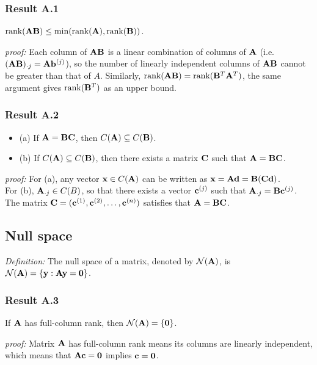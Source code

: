 \subsubsection*{Result A.1}
$\mbox{rank}(\mathbf{AB}) \le \min(\mbox{rank}(\mathbf{A}), \mbox{rank}(\mathbf{B}))$.

{\it proof:} Each column of $\mathbf{AB}$ is a linear combination of columns of $\mathbf{A}$ (i.e.~$(\mathbf{AB})_{\cdot j} = \mathbf{A} \mathbf{b}^{(j)}$), 
so the number of linearly independent columns of $\mathbf{AB}$ cannot be greater than that of $A$.  Similarly, $\mbox{rank}(\mathbf{AB}) = \mbox{rank}(\mathbf{B}^T\mathbf{A}^T)$, the same argument gives $\mbox{rank}(\mathbf{B}^T)$ as an upper bound.


\subsubsection*{Result A.2}
\begin{itemize}
 \item (a) If $\mathbf{A} = \mathbf{BC}$, then $\mathnormal{C}(\mathbf{A}) \subseteq \mathnormal{C}(\mathbf{B})$.
 \item (b) If $\mathnormal{C}(\mathbf{A}) \subseteq \mathnormal{C}(\mathbf{B})$, then there exists a matrix $\mathbf{C}$ such that $\mathbf{A} = \mathbf{BC}$.
\end{itemize}

{\it proof: }
For (a), any vector $\mathbf{x} \in \mathnormal{C}(\mathbf{A})$ can be written as $\mathbf{x} = \mathbf{Ad} = \mathbf{B(Cd)}$.\\
For (b), $\mathbf{A}_{\cdot j} \in \mathnormal{C}(B)$, so that there exists a vector $\mathbf{c}^{(j)}$ such that $\mathbf{A}_{\cdot j} =  \mathbf{B} \mathbf{c}^{(j)}$.  The matrix $\mathbf{C} = (\mathbf{c}^{(1)}, \mathbf{c}^{(2)}, \dots, \mathbf{c}^{(n)})$ satisfies that $\mathbf{A} = \mathbf{BC}$.


\subsection*{Null space}

{\it Definition:} The null space of a matrix, denoted by $\mathcal{N}(\mathbf{A})$, is $\mathcal{N}(\mathbf{A}) = \{\mathbf{y} : \mathbf{Ay} = \mathbf{0}\}$.

\subsubsection*{Result A.3}
If $\mathbf{A}$ has full-column rank, then $\mathcal{N}(\mathbf{A}) = \{\mathbf{0}\}$.

{\it proof:} Matrix $\mathbf{A}$ has full-column rank means its columns are linearly independent, which means that $\mathbf{Ac} = \mathbf{0}$ implies $\mathbf{c} = \mathbf{0}$.


